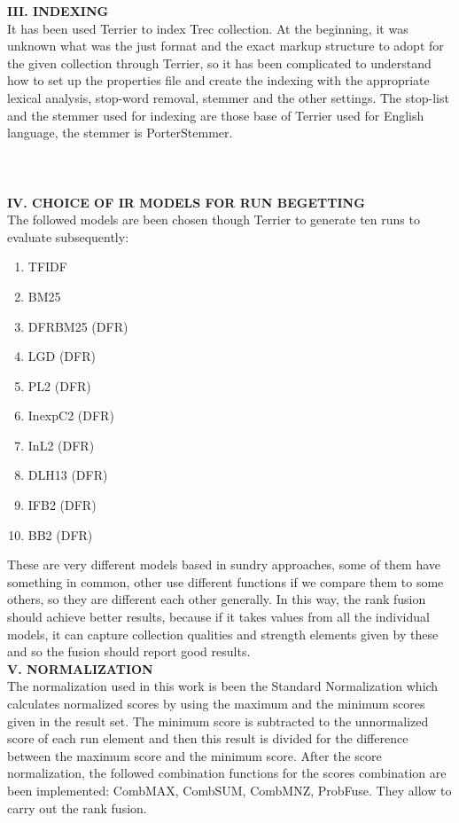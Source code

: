 \documentclass[12pt,journal]{IEEEtran}
\begin{document}
\textbf{III. INDEXING} \\
It has been used Terrier to index Trec collection. 
At the beginning, it was unknown what was the just format and the exact markup structure to adopt for the given collection through Terrier, so it has been complicated to understand how to set up the properties file and create the indexing with the appropriate lexical analysis, stop-word removal, stemmer and the other settings. The stop-list and the stemmer used for indexing are those base of Terrier used for English language, the stemmer is PorterStemmer. \\ \\ \\ \\

\textbf{IV. CHOICE OF IR MODELS FOR RUN BEGETTING} \\
The followed models are been chosen though Terrier to generate ten runs to evaluate subsequently: 
\begin{enumerate}
\item TFIDF
\item BM25
\item DFRBM25 (DFR)
\item LGD (DFR)
\item PL2 (DFR)
\item InexpC2 (DFR)
\item InL2 (DFR)
\item DLH13 (DFR)
\item IFB2 (DFR)
\item BB2 (DFR)
\end{enumerate} 
These are very different models based in sundry approaches, some of them have something in common, other use different functions if we compare them to some others, so they are different each other generally. In this way, the rank fusion should achieve better results, because if it takes values from all the individual models, it can capture collection qualities and strength elements given by these and so the fusion should report good results. \\

\textbf{V. NORMALIZATION} \\
The normalization used in this work is been the Standard Normalization which calculates normalized scores by using the maximum and the minimum scores given in the result set. 
The minimum score is subtracted to the unnormalized score of each run element and then this result is divided for the difference between the maximum score and the minimum score.
After the score normalization, the followed combination functions for the scores combination are been implemented: CombMAX, CombSUM, CombMNZ, ProbFuse.
They allow to carry out the rank fusion. \\
\end{document}
